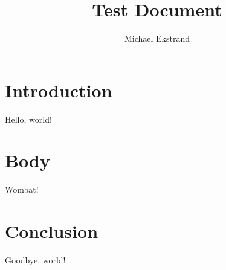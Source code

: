 \documentclass[12pt,letterpaper]{article}
\title{Test Document}
\author{Michael Ekstrand}
\begin{document}
\maketitle

\section{Introduction}
Hello, world! \cite{journals/fthci/EkstrandRK11}

\section{Body}
Wombat!

\section{Conclusion}
Goodbye, world!


\end{document}
